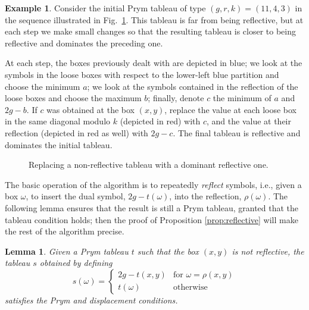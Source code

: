 \documentclass[11pt,reqno]{amsart}
\theoremstyle{definition}
\theoremstyle{problem}
\newtheorem{example}[definition]{Example}
\theoremstyle{plain}
\newtheorem{lemma}[definition]{Lemma}
\theoremstyle{remark}
\theoremstyle{theorem}
\numberwithin{equation}{section}
\numberwithin{figure}{section}
\theoremstyle{definition}
\theoremstyle{problem}
\newtheorem{example}[definition]{Example}
\theoremstyle{plain}
\begin{document}
\begin{example}\label{ex:1}
  Consider the initial Prym tableau of type $(g,r,k)=(11,4,3)$ in the sequence
  illustrated in Fig.~\ref{fig:reflective}.  This tableau is far from
  being reflective, but at each step we make small changes so that the
  resulting tableau is closer to being reflective and dominates the
  preceding one.  
  
 
  At each step, the boxes previously dealt with are depicted in blue;
  we look at the symbols in the loose boxes with respect to the
  lower-left blue partition and choose the minimum $a$; we look at the
  symbols contained in the reflection of the loose boxes and choose
  the maximum $b$; finally, denote $c$ the minimum of $a$ and $2g-b$.
  If $c$ was obtained at the box $(x,y)$, replace the value at each
  loose box in the same diagonal modulo $k$ (depicted in red) with $c$,
  and the value at their reflection (depicted in red as well) with
  $2g-c$. The final tableau is reflective and dominates the initial
  tableau.

  \begin{figure}[H]
    
    \caption{Replacing a non-reflective tableau with a dominant
      reflective one.}
    \label{fig:reflective}
  \end{figure}
\end{example}

The basic operation of the algorithm is to repeatedly \textit{reflect}
symbols, i.e., given a box $\omega$, to insert the dual symbol,
$2g - t(\omega)$, into the reflection, $\rho(\omega)$.  The following
lemma ensures that the result is still a Prym tableau, granted that
the tableau condition holds; then the proof of Proposition
\ref{prop:reflective} will make the rest of the algorithm precise.

\begin{lemma}\label{lem:5}
  Given a Prym tableau $t$ such that the box $(x,y)$ is not
  reflective, the tableau $s$ obtained by defining  
  \begin{equation}\label{eq:18}
    s(\omega) =    
    \begin{cases}
      2g - t(x,y) &\text{for } \omega = \rho(x,y) \\
      t(\omega) &\text{otherwise}
    \end{cases}
  \end{equation}
  satisfies the Prym and displacement conditions.
\end{lemma}
\end{document}
